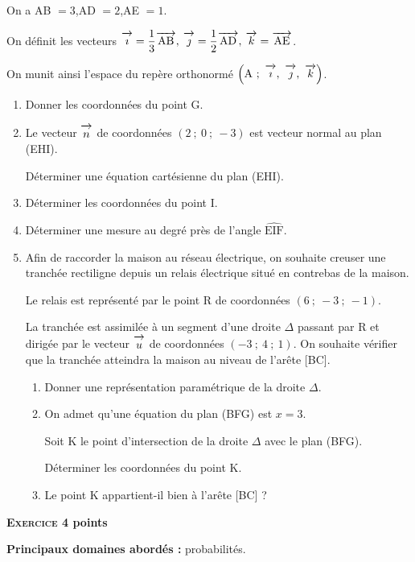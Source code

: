 \documentclass[11pt]{article}
\newcommand{\vect}[1]{\overrightarrow{\,\mathstrut#1\,}}
\begin{document}
On a AB $= 3$,\quad AD $= 2$,\quad AE $= 1$.

On définit les vecteurs $\vect{\imath}= \dfrac13\vect{\text{AB}},\:\vect{\jmath}= \dfrac12\vect{\text{AD}}, \:\vect{k} = \vect{\text{AE}}$.

On munit ainsi l'espace du repère orthonormé $\left(\text{A}~;~\vect{\imath},~\vect{\jmath},~\vect{k}\right)$.

\medskip

\begin{enumerate}
\item Donner les coordonnées du point G.
\item Le vecteur $\vect{n}$ de coordonnées $(2~;~0~;~-3)$ est vecteur normal au plan (EHI).

Déterminer une équation cartésienne du plan (EHI).
\item Déterminer les coordonnées du point I.
\item Déterminer une mesure au degré près de l'angle $\widehat{\text{EIF}}$.
\item Afin de raccorder la maison au réseau électrique, on souhaite creuser une tranchée rectiligne depuis un relais électrique situé en contrebas de la maison.

Le relais est représenté par le point R de coordonnées $(6~;~- 3~;~- 1)$.

La tranchée est assimilée à un segment d'une droite $\Delta$ passant par R et dirigée par le vecteur $\vect{u}$ de coordonnées $(-3~;~4~;~1)$. On souhaite vérifier que la tranchée atteindra la maison au niveau de l'arête [BC].
	\begin{enumerate}
		\item Donner une représentation paramétrique de la droite $\Delta$.
		\item On admet qu'une équation du plan (BFG) est $x = 3$.
		
Soit K le point d'intersection de la droite $\Delta$ avec le plan (BFG).

Déterminer les coordonnées du point K.
		\item Le point K appartient-il bien à l'arête [BC] ?
	\end{enumerate}
\end{enumerate}

\bigskip

\textbf{\textsc{Exercice 4}  points\hfill}

\medskip

\textbf{Principaux domaines abordés :} 
probabilités.
\end{document}

